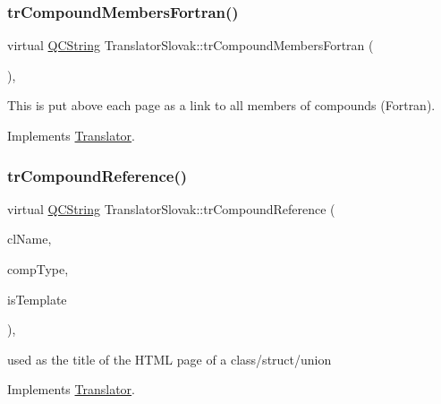\subsubsection{\texorpdfstring{trCompoundMembersFortran()}{trCompoundMembersFortran()}}
{\footnotesize\ttfamily virtual \mbox{\hyperlink{class_q_c_string}{Q\+C\+String}} Translator\+Slovak\+::tr\+Compound\+Members\+Fortran (\begin{DoxyParamCaption}{ }\end{DoxyParamCaption})\hspace{0.3cm}{\ttfamily [inline]}, {\ttfamily [virtual]}}

This is put above each page as a link to all members of compounds (Fortran). 

Implements \mbox{\hyperlink{class_translator}{Translator}}.

\mbox{\label{class_translator_slovak_a098d8e69c60078c383cfab12e6771898}} 
\subsubsection{\texorpdfstring{trCompoundReference()}{trCompoundReference()}}
{\footnotesize\ttfamily virtual \mbox{\hyperlink{class_q_c_string}{Q\+C\+String}} Translator\+Slovak\+::tr\+Compound\+Reference (\begin{DoxyParamCaption}\item[{const char $\ast$}]{cl\+Name,  }\item[{\mbox{\hyperlink{class_class_def_ae70cf86d35fe954a94c566fbcfc87939}{Class\+Def\+::\+Compound\+Type}}}]{comp\+Type,  }\item[{bool}]{is\+Template }\end{DoxyParamCaption})\hspace{0.3cm}{\ttfamily [inline]}, {\ttfamily [virtual]}}

used as the title of the H\+T\+ML page of a class/struct/union 

Implements \mbox{\hyperlink{class_translator}{Translator}}.

\mbox{\label{class_translator_slovak_a68a769754184fb32a940bd05510e3bd8}} 
